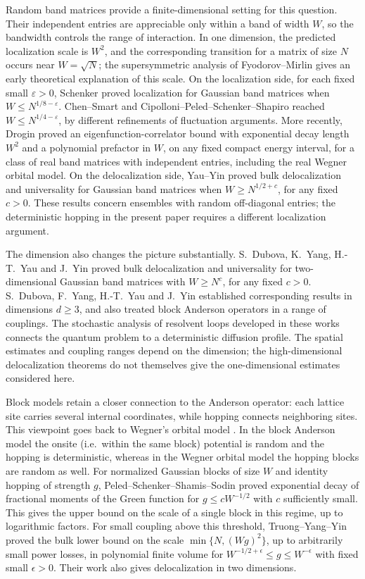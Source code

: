 \documentclass[11pt]{article}
\numberwithin{equation}{section}
\theoremstyle{remark}
\begin{document}
Random band matrices provide a finite-dimensional setting for this
question. Their independent entries are appreciable only within a band
of width \(W\), so the bandwidth controls the range of interaction.
In one dimension, the predicted localization scale is \(W^2\), and the
corresponding transition for a matrix of size \(N\) occurs near
\(W=\sqrt N\); the supersymmetric analysis of Fyodorov--Mirlin
\cite{FM} gives an early theoretical explanation of this scale.
On the localization side, for each fixed small \(\varepsilon>0\),
Schenker \cite{Schenker} proved localization for Gaussian band matrices
when \(W\le N^{1/8-\varepsilon}\). Chen--Smart
\cite{CS} and Cipolloni--Peled--Schenker--Shapiro \cite{CPSS} reached
\(W\le N^{1/4-\varepsilon}\), by different refinements of fluctuation arguments.
More recently, Drogin \cite{DroginRBM} proved an
eigenfunction-correlator bound with exponential decay length \(W^2\)
and a polynomial prefactor in \(W\), on any fixed compact energy interval,
for a class of real band matrices with independent entries, including
the real Wegner orbital model. On the delocalization side, Yau--Yin
\cite{YY} proved bulk delocalization and
universality for Gaussian band matrices when
\(W\ge N^{1/2+c}\), for any fixed \(c>0\).
These results concern ensembles with random off-diagonal entries;
the deterministic hopping in the present paper requires a different
localization argument.

The dimension also changes the picture substantially.
S.~Dubova, K.~Yang, H.-T.~Yau and J.~Yin \cite{DYY2D} proved bulk delocalization and
universality for two-dimensional Gaussian band matrices with
\(W\ge N^c\), for any fixed \(c>0\).
S.~Dubova, F.~Yang, H.-T.~Yau and J.~Yin \cite{DYYY}
established corresponding results in dimensions \(d\ge3\),
and also treated block Anderson operators in a range of couplings.
The stochastic analysis of resolvent loops developed in these works
connects the quantum problem to a deterministic diffusion profile.
The spatial estimates and coupling ranges depend on the dimension;
the high-dimensional delocalization theorems do not themselves give
the one-dimensional estimates considered here.

Block models retain a closer connection to the Anderson operator:
each lattice site carries several internal coordinates, while hopping
connects neighboring sites. This viewpoint goes back to Wegner's
orbital model \cite{Wegner}. In the block Anderson model the onsite (i.e.\ within the same block)
potential is random and the hopping is deterministic, whereas in the
Wegner orbital model the hopping blocks are random as well.
For normalized Gaussian blocks of size \(W\) and identity hopping
of strength \(g\), Peled--Schenker--Shamis--Sodin
\cite{PSSS} proved exponential decay of fractional moments
of the Green function for \(g\le cW^{-1/2}\) with \(c\) sufficiently
small. This gives the upper bound on the scale of a single block in
this regime, up to logarithmic factors. For small coupling above this
threshold, Truong--Yang--Yin \cite{TYY} proved the bulk
lower bound on the scale \(\min\{N,(Wg)^2\}\), up to arbitrarily small
power losses, in polynomial finite volume for
\(W^{-1/2+\epsilon}\le g\le W^{-\epsilon}\) with fixed small \(\epsilon>0\).
Their work also gives delocalization in two dimensions.
\end{document}
